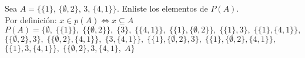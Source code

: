 \section{}
\noindent Sea $A = \{\{1\}$, $\{ \emptyset , 2\}$, $3$, $\{4,1\}\}$. Enliste los elementos de $P(A)$.\\

Por definición: $x \in p(A) \iff x \subseteq A$\\

$P(A) = \{ \emptyset ,\; \{\{1\}\} ,\; \{\{\emptyset, 2\}\} ,\; \{3\} ,\; \{\{4, 1\}\} ,\; \{\{1\}, \{\emptyset , 2\}\} , \; \{\{1\},3\} ,\; \{\{1\},\{4,1\}\} ,$
\indent $\{\{\emptyset , 2\},3\} ,\; \{\{ \emptyset , 2\},\{4,1\}\} ,\; \{3,\{4,1\}\} ,\; \{\{1\},\{ \emptyset, 2\},3\} ,\; \{\{1\},\{ \emptyset , 2\},\{4,1\}\} ,$
\indent $\{\{1\},3,\{4,1\}\} ,\; \{\{ \emptyset , 2\},3,\{4,1\} ,\; A\}$